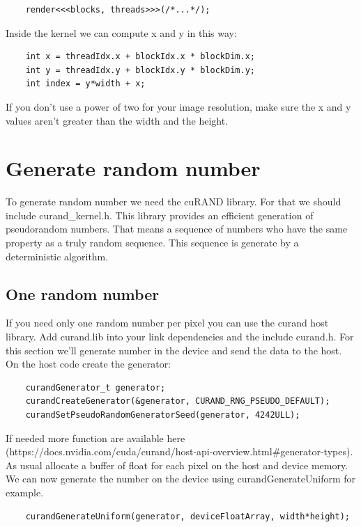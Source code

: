 \documentclass{article}
\begin{document}
\begin{lstlisting}
	render<<<blocks, threads>>>(/*...*/);
\end{lstlisting}

Inside the kernel we can compute x and y in this way:
\begin{lstlisting}
	int x = threadIdx.x + blockIdx.x * blockDim.x;
	int y = threadIdx.y + blockIdx.y * blockDim.y;
	int index = y*width + x;
\end{lstlisting}
If you don't use a power of two for your image resolution, make sure the x and y values aren't greater than the width and the height.

\section{Generate random number}
To generate random number we need the cuRAND library. For that we should include curand\_kernel.h. This library provides an efficient generation of pseudorandom numbers. That means a sequence of numbers who have the same property as a truly random sequence. This sequence is generate by a deterministic algorithm.

\subsection{One random number}
If you need only one random number per pixel you can use the curand host library. Add curand.lib into your link dependencies and the include curand.h. For this section we'll generate number in the device and send the data to the host. On the host code create the generator:

\begin{lstlisting}
	curandGenerator_t generator;
	curandCreateGenerator(&generator, CURAND_RNG_PSEUDO_DEFAULT);
	curandSetPseudoRandomGeneratorSeed(generator, 4242ULL);
\end{lstlisting}

If needed more function are available here (https://docs.nvidia.com/cuda/curand/host-api-overview.html\#generator-types).\\
As usual allocate a buffer of float for each pixel on the host and device memory. We can now generate the number on the device using curandGenerateUniform for example.

\begin{lstlisting}
	curandGenerateUniform(generator, deviceFloatArray, width*height);
\end{lstlisting}
\end{document}
